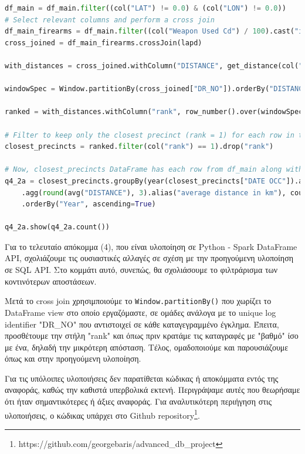 \documentclass{article}
\begin{document}
\begin{lstlisting}[language=Python, caption={Query 4 2a - DF}]
    df_main = df_main.filter((col("LAT") != 0.0) & (col("LON") != 0.0))
# Select relevant columns and perform a cross join
df_main_firearms = df_main.filter((col("Weapon Used Cd") / 100).cast("int") == 1).select("DR_NO", "LAT", "LON", "DATE OCC", "AREA")
cross_joined = df_main_firearms.crossJoin(lapd)

with_distances = cross_joined.withColumn("DISTANCE", get_distance(col("LAT"), col("LON"), col("Y"), col("X")))

windowSpec = Window.partitionBy(cross_joined["DR_NO"]).orderBy("DISTANCE")

ranked = with_distances.withColumn("rank", row_number().over(windowSpec))

# Filter to keep only the closest precinct (rank = 1) for each row in the main DataFrame
closest_precincts = ranked.filter(col("rank") == 1).drop("rank")

# Now, closest_precincts DataFrame has each row from df_main along with the details of its closest precinct
q4_2a = closest_precincts.groupBy(year(closest_precincts["DATE OCC"]).alias("Year")) \
    .agg(round(avg("DISTANCE"), 3).alias("average distance in km"), count("*").alias("Count")) \
    .orderBy("Year", ascending=True)

q4_2a.show(q4_2a.count())
\end{lstlisting}


Για το τελευταίο απόκομμα (4), που είναι υλοποίηση σε  Python - Spark DataFrame API, σχολιάζουμε τις ουσιαστικές αλλαγές σε σχέση με την προηγούμενη υλοποίηση σε  SQL API. Στο κομμάτι αυτό, συνεπώς, θα σχολιάσουμε το φιλτράρισμα των κοντινότερων αποστάσεων. 


Μετά το  cross join  χρησιμποιούμε το \texttt{Window.partitionBy()}  που χωρίζει το  DataFrame view  στο οποίο εργαζόμαστε, σε ομάδες ανάλογα με το  unique log identifier "DR\_NO"  που αντιστοιχεί σε κάθε καταγεγραμμένο έγκλημα. Έπειτα, προσθέτουμε την στήλη "rank"  και όπως πριν κρατάμε τις καταγραφές με "βαθμό" ίσο με ένα, δηλαδή την μικρότερη απόσταση. Τέλος, ομαδοποιούμε και παρουσιάζουμε όπως και στην προηγούμενη υλοποίηση. 


Για τις υπόλοιπες υλοποιήσεις δεν παρατίθεται κώδικας ή αποκόμματα εντός της αναφοράς, καθώς την καθιστά υπερβολικά εκτενή. Περιγράψαμε αυτές που θεωρήσαμε ότι ήταν σημαντικότερες ή άξιες αναφοράς. Για αναλυτικότερη περιήγηση στις υλοποιήσεις, ο κώδικας υπάρχει στο Github repository\footnote{https://github.com/georgebaris/advanced\_db\_project}.
\end{document}

